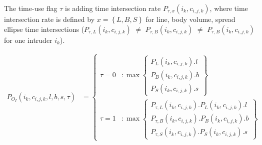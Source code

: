 The time-use flag $\tau$ is adding time intersection rate $P_{\tau,x}(i_k,c_{i,j,k})$, where time intersection rate is defined by $x=\left\{L,B,S\right\}$ for line, body volume, spread ellipse time intersections ($P_{\tau,L}(i_k,c_{i,j,k})$ $\neq$ $P_{\tau,B}(i_k,c_{i,j,k})$ $\neq$ $P_{\tau,B}(i_k,c_{i,j,k})$ for one intruder $i_k$).

\begin{equation}\label{eq:intruderInCellProbabilityOneIntruder}
    \begin{aligned}
        P_{O_I}(i_k,c_{i,j,k},l,b,s,\tau) & = \begin{cases}\tau=0&:\max\left\{\begin{aligned}P_L(i_k,c_{i,j,k}).l\\ P_B(i_k,c_{i,j,k}).b\\P_S(i_k,c_{i,j,k}).s\end{aligned}\right\}\\\tau=1&:\max\left\{\begin{aligned}P_{\tau,L}(i_k,c_{i,j,k}).P_L(i_k,c_{i,j,k}).l\\ P_{\tau,B}(i_k,c_{i,j,k}).P_B(i_k,c_{i,j,k}).b\\P_{\tau,S}(i_k,c_{i,j,k}).P_S(i_k,c_{i,j,k}).s\end{aligned}\right\}\end{cases} &\\
    \end{aligned}
\end{equation}